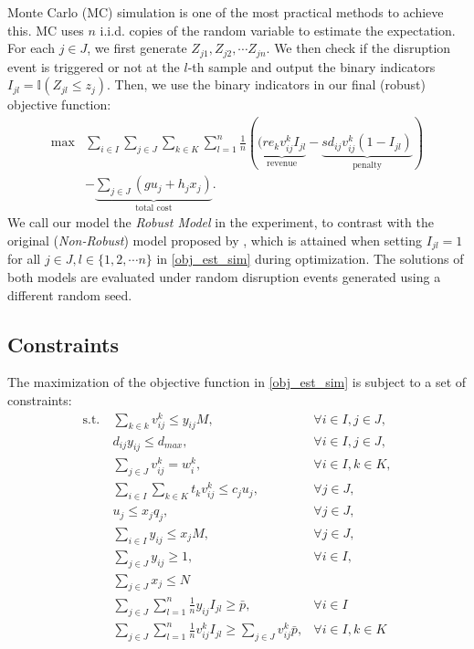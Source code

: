 \documentclass[preprint]{oscmjournal}
\theoremstyle{remark}
\begin{document}
Monte Carlo (MC) simulation is one of the most practical methods to achieve this. MC uses $n$ i.i.d. copies of the random variable to estimate the expectation. For each $j \in J$, we first generate $Z_{j1}, Z_{j2}, \cdots Z_{jn}$. We then check if the disruption event is triggered or not at the $l$-th sample and output the binary indicators $I_{jl} = \mathbb I (Z_{jl} \leq z_j)$. Then, we use the binary indicators in our final (robust) objective function:
\begin{align}
\max &\sum_{i \in I} \sum_{j \in J} \sum_{k \in K}
 \sum_{l=1}^n  \frac1n \left( \underbrace{(r e_k v_{ij}^k  I_{jl}}_{\text{revenue}}
- \underbrace{s d_{ij}  v_{ij}^k (1-I_{jl})}_{\text{penalty}} \right) \nonumber \\
&-  \underbrace{\sum_{j \in J} (g u_j + h_j x_j)}_{\text{total cost}}.
\label{obj_est_sim}
\end{align}
We call our model the \textit{Robust Model} in the experiment, to contrast with the original (\textit{Non-Robust}) model proposed by \textcite{amilia2022designing}, which is attained when setting  $I_{jl} = 1$ for all $j \in J, l \in \{1, 2, \cdots n\}$ in \eqref{obj_est_sim} during optimization. The solutions of both models are evaluated under random disruption events generated using a different random seed.


\subsection{Constraints}
The maximization of the objective function in \eqref{obj_est_sim} is subject to a set of constraints:
\begin{align}
    \text{s.t.}~&\sum_{k \in k} v_{ij}^k \leq y_{ij} M, &\forall i \in I, j \in J, \label{numberassigned}\\
    &d_{ij} y_{ij} \leq d_{max} , &\forall i \in I, j \in J, \label{distmax}\\
    &\sum_{j \in J} v_{ij}^k = w_i^k, & \forall i \in I, k \in K,
    \label{demandfulfilled}\\
    &\sum_{i \in I} \sum_{k \in K} t_k v_{ij}^k  \leq c_j u_j, & \forall j \in J, \label{charging_cap}\\
    &u_j \leq  x_j q_j, & \forall j \in J, \label{capacityopened}\\
    &\sum_{i \in I} y_{ij} \leq x_j M, & \forall j \in J, \label{assignedopened}\\
    &\sum_{j \in J} y_{ij} \geq 1, & \forall i \in I, \label{demandassigned}\\
    &\sum_{j \in J} x_j \leq N & \label{maxstations}\\
    &\sum_{j \in J} \sum_{l=1}^n \frac1n y_{ij}  I_{jl} \geq \bar{p}, & \forall i \in I \label{reliability}\\
    &\sum_{j \in J} \sum_{l=1}^n \frac1n v_{ij}^k I_{jl} \geq \sum_{j \in J} v_{ij}^k\bar{p}, & \forall i \in I, k \in K \label{reliability_v} %
\end{align}
\end{document}
